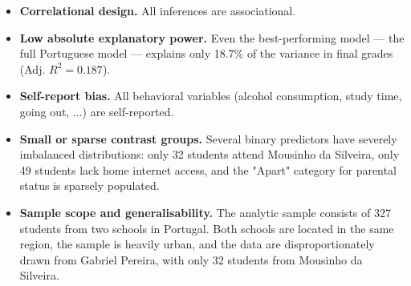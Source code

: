 \documentclass{article}
\begin{document}
\begin{itemize}
    \item \textbf{Correlational design.} All inferences are associational.

    \item \textbf{Low absolute explanatory power.} Even the best-performing model --- the full Portuguese model --- explains only 18.7\% of the variance in final grades (Adj. $R^2 = 0.187$).

    \item \textbf{Self-report bias.} All behavioral variables (alcohol consumption, study time, going out, ...) are self-reported.

    \item \textbf{Small or sparse contrast groups.} Several binary predictors have severely imbalanced distributions: only 32 students attend Mousinho da Silveira, only 49 students lack home internet access, and the "Apart" category for parental status is sparsely populated.

    \item \textbf{Sample scope and generalisability.} The analytic sample consists of 327 students from two schools in Portugal. Both schools are located in the same region, the sample is heavily urban, and the data are disproportionately drawn from Gabriel Pereira, with only 32 students from Mousinho da Silveira.
\end{itemize}
\end{document}
